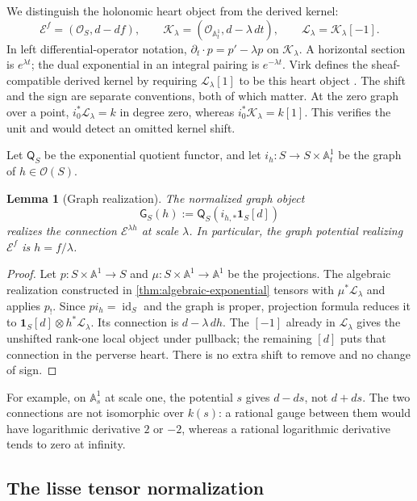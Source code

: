 \documentclass[11pt]{article}
\numberwithin{equation}{section}
\newtheorem{lemma}[lemma]{Lemma}
\theoremstyle{definition}
\theoremstyle{remark}
\newcommand{\A}{\mathbb A}
\newcommand{\Ocal}{\mathcal O}
\newcommand{\Ecal}{\mathcal E}
\newcommand{\id}{\operatorname{id}}
\newcommand{\one}{\mathbf1}
\begin{document}
We distinguish the holonomic heart object from the derived kernel:
\begin{equation}\label{eq:exponential-sign}
 \Ecal^f=(\Ocal_S,d-df),\qquad
 \mathscr K_\lambda=(\Ocal_{\A^1_t},d-\lambda\,dt),\qquad
 \mathscr L_\lambda=\mathscr K_\lambda[-1].
\end{equation}
In left differential-operator notation,
$\partial_t\cdot p=p'-\lambda p$ on $\mathscr K_\lambda$.
A horizontal section is $e^{\lambda t}$; the dual exponential in an
integral pairing is $e^{-\lambda t}$. Virk defines the sheaf-compatible
derived kernel by requiring $\mathscr L_\lambda[1]$ to be this heart
object \cite[\S6.6 and Proposition~6.8]{Virk}.
The shift and the sign are separate conventions, both of which matter.
At the zero graph over a point, $i_0^*\mathscr L_\lambda=k$ in degree
zero, whereas $i_0^*\mathscr K_\lambda=k[1]$. This verifies the unit and
would detect an omitted kernel shift.

Let $\mathsf Q_S$ be the exponential quotient functor, and let
$i_h:S\to S\times\A^1_t$ be the graph of $h\in\Ocal(S)$.

\begin{lemma}[Graph realization]\label{lem:graph}
The normalized graph object
\[
  \mathsf G_S(h):=\mathsf Q_S(i_{h,*}\one_S[d])
\]
realizes the connection $\Ecal^{\lambda h}$ at scale $\lambda$. In
particular, the graph potential realizing $\Ecal^f$ is $h=f/\lambda$.
\end{lemma}
\begin{proof}
Let $p:S\times\A^1\to S$ and $\mu:S\times\A^1\to\A^1$ be the
projections. The algebraic realization constructed in
\cref{thm:algebraic-exponential} tensors with
$\mu^*\mathscr L_\lambda$ and applies $p_!$. Since $p i_h=\id_S$ and
the graph is proper, projection formula reduces it to
$\one_S[d]\otimes h^*\mathscr L_\lambda$. Its connection is
$d-\lambda\,dh$. The $[-1]$ already in $\mathscr L_\lambda$ gives the
unshifted rank-one local object under pullback; the remaining $[d]$ puts
that connection in the perverse heart. There is no extra shift to remove
and no change of sign.
\end{proof}

For example, on $\A^1_s$ at scale one, the potential $s$ gives $d-ds$,
not $d+ds$. The two connections are not isomorphic over $k(s)$: a rational
gauge between them would have logarithmic derivative $2$ or $-2$, whereas
a rational logarithmic derivative tends to zero at infinity.

\subsection{The lisse tensor normalization}
\end{document}
